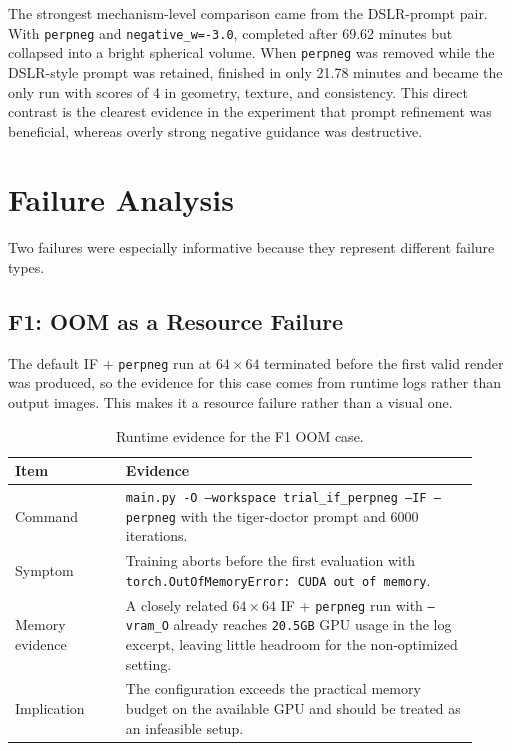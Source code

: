\documentclass[sigconf,nonacm]{acmart}
\begin{document}
The strongest mechanism-level comparison came from the DSLR-prompt pair. With \texttt{perpneg} and \texttt{negative\_w=-3.0},  completed after 69.62 minutes but collapsed into a bright spherical volume. When \texttt{perpneg} was removed while the DSLR-style prompt was retained,  finished in only 21.78 minutes and became the only run with scores of 4 in geometry, texture, and consistency. This direct contrast is the clearest evidence in the experiment that prompt refinement was beneficial, whereas overly strong negative guidance was destructive.

\section{Failure Analysis}
Two failures were especially informative because they represent different failure types.

\subsection{F1: OOM as a Resource Failure}
The default IF + \texttt{perpneg} run at $64\times64$ terminated before the first valid render was produced, so the evidence for this case comes from runtime logs rather than output images. This makes it a resource failure rather than a visual one.

\begin{table}[!t]
\caption{Runtime evidence for the F1 OOM case.}
\label{tab:f1-oom}
\centering
\footnotesize
\setlength{\tabcolsep}{4pt}
\renewcommand{\arraystretch}{1.12}
\begin{tabular}{p{0.22\linewidth} p{0.70\linewidth}}
\toprule
Item & Evidence \\
\midrule
Command & \texttt{main.py -O --workspace trial\_if\_perpneg --IF --perpneg} with the tiger-doctor prompt and 6000 iterations. \\
Symptom & Training aborts before the first evaluation with \texttt{torch.OutOfMemoryError: CUDA out of memory}. \\
Memory evidence & A closely related $64\times64$ IF + \texttt{perpneg} run with \texttt{--vram\_O} already reaches \texttt{20.5GB} GPU usage in the log excerpt, leaving little headroom for the non-optimized setting. \\
Implication & The configuration exceeds the practical memory budget on the available GPU and should be treated as an infeasible setup. \\
\bottomrule
\end{tabular}
\end{table}
\end{document}
